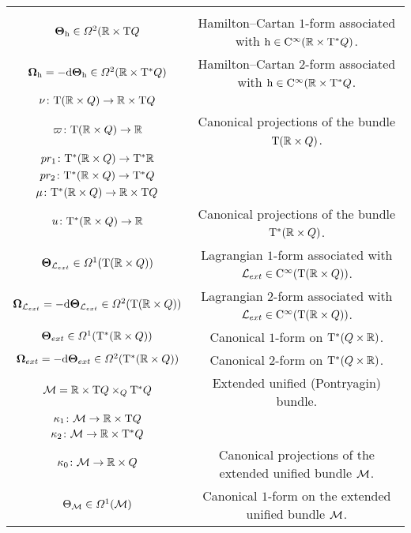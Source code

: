 \documentclass[12pt]{report}
\def\df{{\mit\Omega}}
\def\Lag{{\cal L}}
\def\d{{\rm d}}
\def\Real{\mathbb{R}}
\def\Tan{{\rm T}}
\def\Cinfty{{\rm C}^\infty}
\begin{document}
\begin{center}
{\scriptsize
\begin{tabular}{|c|c|}
\hline
 & \\
 $\mbox{\boldmath $\Theta$}_{\rm h}\in\df^2(\Real\times\Tan Q$ &
Hamilton--Cartan $1$-form associated with ${\rm h}\in\Cinfty(\Real\times\Tan^*Q)$. \\
$\mbox{\boldmath $\Omega$}_{\rm h}=-\d\mbox{\boldmath $\Theta$}_{\rm h}\in\df^2(\Real\times\Tan^*Q)$ &
Hamilton--Cartan $2$-form associated with ${\rm h}\in\Cinfty(\Real\times\Tan^*Q$. \\
$\nu\colon\Tan(\Real \times Q)\rightarrow \Real\times\Tan Q$ & \\
$\varpi\colon\Tan(\Real \times Q)\rightarrow \Real$ &
Canonical projections of the bundle $\Tan(\Real \times Q)$. \\
$pr_1\colon\Tan^*(\Real \times Q)\rightarrow \Tan^*\Real$ & \\
$pr_2\colon\Tan^*(\Real \times Q)\rightarrow\Tan^*Q$ & \\
$\mu\colon\Tan^*(\Real \times Q)\rightarrow\Real\times\Tan Q$ & \\
$u\colon\Tan^*(\Real \times Q)\rightarrow\Real$ & 
Canonical projections of the bundle $\Tan^*(\Real\times Q)$. \\
 ${\mathbf \Theta}_{{\cal L}_{ext}}\in\df^1(\Tan (\Real\times Q))$ &
Lagrangian $1$-form associated with $\Lag_{ext}\in\Cinfty(\Tan(\Real\times Q))$. \\
${\mathbf \Omega}_{{\cal L}_{ext}}=-\d{\mathbf \Theta}_{{\cal L}_{ext}}\in\df^2(\Tan (\Real\times Q))$ &
Lagrangian $2$-form associated with $\Lag_{ext}\in\Cinfty(\Tan(\Real\times Q))$. \\
 ${\mathbf \Theta}_{ext}\in\df^1(\Tan^*(\Real\times Q))$ &
Canonical $1$-form on $\Tan^*(Q\times\Real)$. \\
$\mbox{\boldmath $\Omega$}_{ext}=-\d\mbox{\boldmath $\Theta$}_{ext}\in\df^2(\Tan^*(\Real\times Q))$  &
Canonical $2$-form on $\Tan^*(Q\times\Real)$. \\
 ${\cal M}=\Real\times\Tan Q\times_Q\Tan^*Q$ &
Extended unified (Pontryagin) bundle. \\ 
$\kappa_1\colon{\cal M}\to\Real\times\Tan Q$ & \\
$\kappa_2\colon{\cal M}\to\Real\times\Tan^*Q$ & \\
$\kappa_0\colon{\cal M}\to\Real\times Q$ &
Canonical projections of the extended unified  bundle ${\cal M}$. \\ 
 $\Theta_{\cal M}\in\df^1({\cal M})$ &
Canonical $1$-form on the extended unified bundle ${\cal M}$. \\ 

\end{tabular}}
\end{center}
\end{document}
